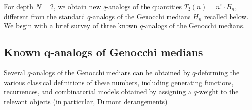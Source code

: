 \documentclass[10pt,a4paper]{amsart}
\numberwithin{equation}{section}
\theoremstyle{definition}
\begin{document}
For depth $N=2$, we obtain new $q$-analogs of the quantities
$T_2(n)=n!\cdot H_n$, different from the standard $q$-analogs of the Genocchi
medians $H_n$ recalled below.
We begin with a brief survey of three known $q$-analogs of the Genocchi medians.

\subsection[Known q-analogs of Genocchi medians]{Known $\boldsymbol{q}$-analogs of Genocchi medians}
\label{subsec:known_q_analogs}

Several $q$-analogs of the Genocchi medians can be obtained by $q$-deforming the
various classical definitions of these numbers, including generating functions,
recurrences, and combinatorial models obtained by assigning a $q$-weight to the
relevant objects (in particular, Dumont derangements).
\end{document}
